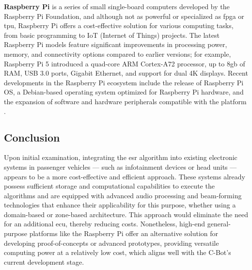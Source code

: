 \textbf{Raspberry Pi} is a series of small single-board computers developed by the Raspberry Pi Foundation, and although not as powerful or specialized as \gls{fpga} or \gls{tpu}, Raspberry Pi offers a cost-effective solution for various computing tasks, from basic programming to IoT (Internet of Things) projects. The latest Raspberry Pi models feature significant improvements in processing power, memory, and connectivity options compared to earlier versions; for example, Raspberry Pi 5 introduced a quad-core ARM Cortex-A72 processor, up to 8\gls{g}\gls{b} of RAM, USB 3.0 ports, Gigabit Ethernet, and support for dual 4K displays.
Recent developments in the Raspberry Pi ecosystem include the release of Raspberry Pi OS, a Debian-based operating system optimized for Raspberry Pi hardware, and the expansion of software and hardware peripherals compatible with the platform \cite{Raspberry2023}.


\subsection{Conclusion}
\label{subsec:ECU_conclusion}


Upon initial examination, integrating the \gls{esr} algorithm into existing electronic systems in passenger vehicles — such as infotainment devices or head units — appears to be a more cost-effective and efficient approach. These systems already possess sufficient storage and computational capabilities to execute the algorithms and are equipped with advanced audio processing and beam-forming technologies that enhance their applicability for this purpose, whether using a domain-based or zone-based architecture. This approach would eliminate the need for an additional \gls{ecu}, thereby reducing costs. Nonetheless, high-end general-purpose platforms like the Raspberry Pi offer an alternative solution for developing proof-of-concepts or advanced prototypes, providing versatile computing power at a relatively low cost, which aligns well with the C-Bot's current development stage.